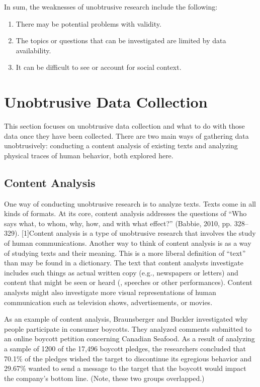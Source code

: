In sum, the weaknesses of unobtrusive research include the following:

\begin{enumerate}
	\item There may be potential problems with validity.
	\item The topics or questions that can be investigated are limited by data availability.
	\item It can be difficult to see or account for social context.
\end{enumerate}

\section{Unobtrusive Data Collection}

This section focuses on unobtrusive data collection and what to do with those data once they have been collected. There are two main ways of gathering data unobtrusively: conducting a content analysis of existing texts and analyzing physical traces of human behavior, both explored here.

\subsection{Content Analysis}

One way of conducting unobtrusive research is to analyze texts. Texts come in all kinds of formats. At its core, content analysis addresses the questions of ``Who says what, to whom, why, how, and with what effect?'' (Babbie, 2010, pp. 328–329). [1]Content analysis is a type of unobtrusive research that involves the study of human communications. Another way to think of content analysis is as a way of studying texts and their meaning. This is a more liberal definition of ``text'' than may be found in a dictionary. The text that content analysts investigate includes such things as actual written copy (e.g., newspapers or letters) and content that might be seen or heard (\eg, speeches or other performances). Content analysts might also investigate more visual representations of human communication such as television shows, advertisements, or movies.

As an example of content analysis, Braunsberger and Buckler \cite{braunsberger2011motivates} investigated why people participate in consumer boycotts. They analyzed comments submitted to an online boycott petition concerning Canadian Seafood. As a result of analyzing a sample of 1200 of the 17,496 boycott pledges, the researchers concluded that 70.1\% of the pledges wished the target to discontinue its egregious behavior and 29.67\% wanted to send a message to the target that the boycott would impact the company's bottom line. (Note, these two groups overlapped.) 

